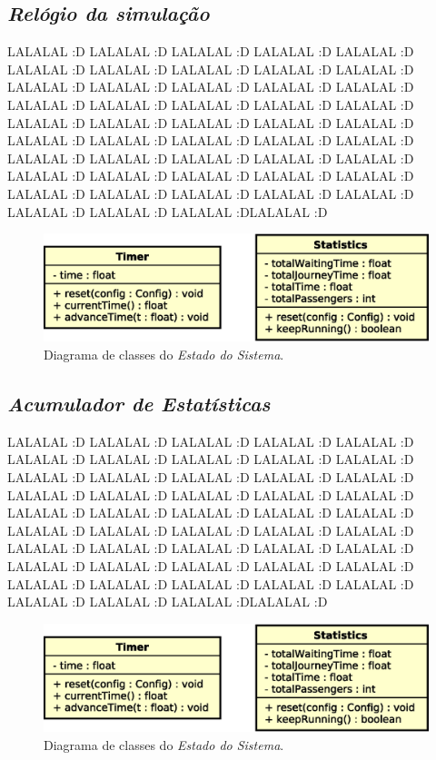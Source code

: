 \subsection{\textit{Relógio da simulação}}

LALALAL :D LALALAL :D LALALAL :D LALALAL :D LALALAL :D LALALAL :D LALALAL :D
LALALAL :D LALALAL :D LALALAL :D LALALAL :D LALALAL :D LALALAL :D LALALAL :D
LALALAL :D LALALAL :D LALALAL :D LALALAL :D LALALAL :D LALALAL :D LALALAL :D
LALALAL :D LALALAL :D LALALAL :D LALALAL :D LALALAL :D LALALAL :D LALALAL :D
LALALAL :D LALALAL :D LALALAL :D LALALAL :D LALALAL :D LALALAL :D LALALAL :D
LALALAL :D LALALAL :D LALALAL :D LALALAL :D LALALAL :D LALALAL :D LALALAL :D
LALALAL :D LALALAL :D LALALAL :D LALALAL :D LALALAL :D LALALAL :DLALALAL :D

\begin{figure}[htb!]
  \centering
  \includegraphics[scale=0.6]{img/TimerStats.eps}
  \caption{Diagrama de classes do \textit{Estado do Sistema}.}
\label{fig:diagram:timer}
\end{figure}

\subsection{\textit{Acumulador de Estatísticas}}

LALALAL :D LALALAL :D LALALAL :D LALALAL :D LALALAL :D LALALAL :D LALALAL :D
LALALAL :D LALALAL :D LALALAL :D LALALAL :D LALALAL :D LALALAL :D LALALAL :D
LALALAL :D LALALAL :D LALALAL :D LALALAL :D LALALAL :D LALALAL :D LALALAL :D
LALALAL :D LALALAL :D LALALAL :D LALALAL :D LALALAL :D LALALAL :D LALALAL :D
LALALAL :D LALALAL :D LALALAL :D LALALAL :D LALALAL :D LALALAL :D LALALAL :D
LALALAL :D LALALAL :D LALALAL :D LALALAL :D LALALAL :D LALALAL :D LALALAL :D
LALALAL :D LALALAL :D LALALAL :D LALALAL :D LALALAL :D LALALAL :DLALALAL :D

\begin{figure}[htb!]
  \centering
  \includegraphics[scale=0.6]{img/TimerStats.eps}
  \caption{Diagrama de classes do \textit{Estado do Sistema}.}
\label{fig:diagram:stats}
\end{figure}

